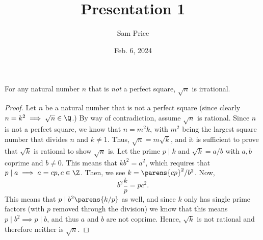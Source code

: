 \documentclass{article}
\author{Sam Price}
\date{Feb. 6, 2024}
\title{Presentation 1}
\begin{document}
\maketitle

\begin{thm}
  For any natural number $n$ that is \textit{not} a perfect square, $\sqrt{n}$ is irrational.
\end{thm}
\begin{proof}
  Let $n$ be a natural number that is not a perfect square (since clearly $n = k^{2} \implies \sqrt{n} \in \Q$.)
  By way of contradiction, assume $\sqrt{n}$ is rational.
  Since $n$ is not a perfect square, we know that $n = m^{2}k$, with $m^{2}$ being the largest square number that
  divides $n$ and $k \ne 1$. Thus, $\sqrt{n} = m\sqrt{k}$, and it is sufficient to prove that $\sqrt{k}$ is rational to show $\sqrt{n}$ is.
  Let the prime $p \mid k$ and $\sqrt{k} = a/b$ with $a, b$ coprime and $b \ne 0$.
  This means that $kb^{2} = a^{2}$, which requires that $p \mid a \implies a = cp, c \in \Z$. Then, we see $k = \parens{cp}^{2}/b^{2}$.
  Now,
  \begin{equation*}
    b^{2}\frac{k}{p} = pc^{2}.
  \end{equation*}
  This means that $p \mid b^{2}\parens{k/p}$ as well, and since $k$ only has single prime factors (with $p$ removed through the division)
  we know that this means $p \mid b^{2} \implies p \mid b$, and thus $a$ and $b$ are not coprime.
  Hence, $\sqrt{k}$ is not rational and therefore neither is $\sqrt{n}$.
\end{proof}
\end{document}
